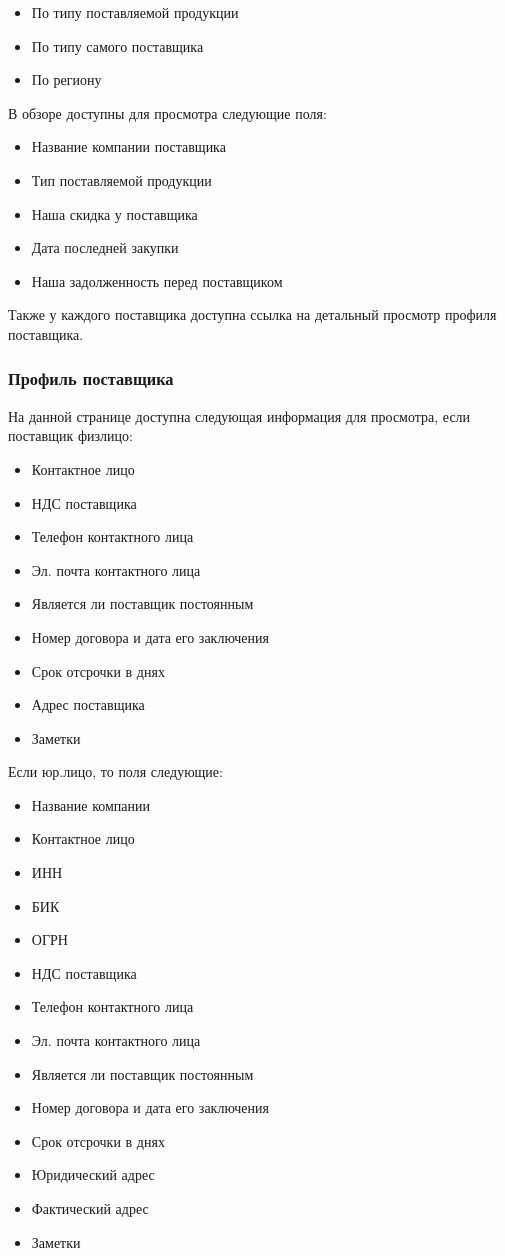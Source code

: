 \documentclass[DIV=calc, paper=a4, fontsize=11pt]{scrartcl} %
\begin{document}
\begin{itemize}
	\item По типу поставляемой продукции
	\item По типу самого поставщика 
	\item По региону
\end{itemize}

В обзоре доступны для просмотра следующие поля:

\begin{itemize}
	\item Название компании поставщика
	\item Тип поставляемой продукции
	\item Наша скидка у поставщика
	\item Дата последней закупки
	\item Наша задолженность перед поставщиком
\end{itemize}

Также у каждого поставщика доступна ссылка на детальный просмотр профиля поставщика.

\subsubsection{Профиль поставщика}

На данной странице доступна следующая информация для просмотра, если поставщик физлицо:

\begin{itemize}
	\item Контактное лицо
	\item НДС поставщика
	\item Телефон контактного лица
	\item Эл. почта контактного лица
	\item Является ли поставщик постоянным
	\item Номер договора и дата его заключения
	\item Срок отсрочки в днях
	\item Адрес поставщика
	\item Заметки
\end{itemize}

Если юр.лицо, то поля следующие:

\begin{itemize}
	\item Название компании
	\item Контактное лицо
	\item ИНН
	\item БИК
	\item ОГРН
	\item НДС поставщика
	\item Телефон контактного лица
	\item Эл. почта контактного лица
	\item Является ли поставщик постоянным
	\item Номер договора и дата его заключения
	\item Срок отсрочки в днях
	\item Юридический адрес
	\item Фактический адрес
	\item Заметки
\end{itemize}
\end{document}
